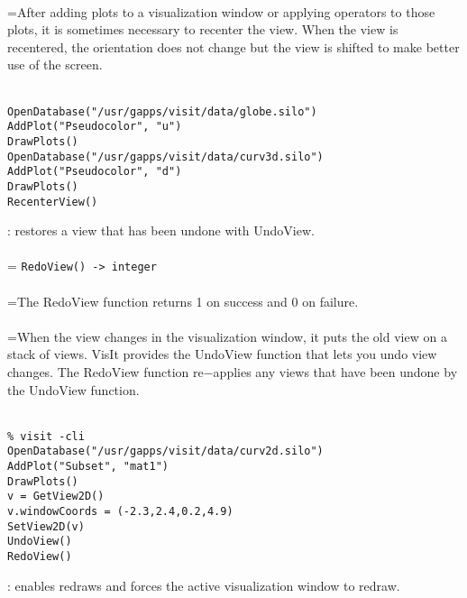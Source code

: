 \documentclass[10pt,a4paper]{report}
\begin{document}
 \\ 
\hangindent=\parindent After adding plots to a visualization window or applying operators to those plots, it is sometimes necessary to recenter the view. When the view is recentered, the orientation does not change but the view is shifted to make better use of the screen. \\[-3mm] 

\\[-6mm]
\begin{verbatim}OpenDatabase("/usr/gapps/visit/data/globe.silo")
AddPlot("Pseudocolor", "u")
DrawPlots()
OpenDatabase("/usr/gapps/visit/data/curv3d.silo")
AddPlot("Pseudocolor", "d")
DrawPlots()
RecenterView()
\end{verbatim}
\newpage


{}
: restores a view that has been undone with UndoView.\\[-3mm]

 \\ 
\hangindent=\parindent 
\verb!RedoView() -> integer!\\ [-3mm]

 \\ 
\hangindent=\parindent The RedoView function returns 1 on success and 0 on failure. \\[-3mm] 

 \\ 
\hangindent=\parindent When the view changes in the visualization window, it puts the old view on a stack of views. VisIt provides the UndoView function that lets you undo view changes. The RedoView function re$-$applies any views that have been undone by the UndoView function. \\[-3mm] 

\\[-6mm]
\begin{verbatim}% visit -cli
OpenDatabase("/usr/gapps/visit/data/curv2d.silo")
AddPlot("Subset", "mat1")
DrawPlots()
v = GetView2D()
v.windowCoords = (-2.3,2.4,0.2,4.9)
SetView2D(v)
UndoView()
RedoView()
\end{verbatim}
\newpage


{}
: enables redraws and forces the active visualization window to redraw.\\[-3mm]
\end{document}
